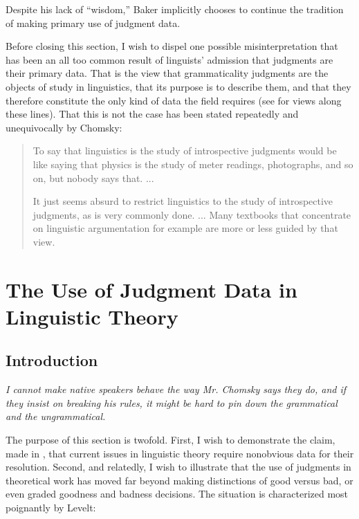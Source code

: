 \noindent
Despite his lack of ``wisdom,'' Baker implicitly chooses to continue the tradition of making primary use of judgment data.

Before closing this section, I wish to dispel one possible misinterpretation that has been an all too common result of linguists' admission that judgments are their primary data. That is the view that grammaticality judgments are the objects of study in linguistics, that its purpose is to describe them, and that they therefore constitute the only kind of data the field requires (see \citet{Sampson1975} for views along these lines). That this is not the case has been stated repeatedly and unequivocally by Chomsky:

\begin{quote}
To say that linguistics is the study of introspective judgments would be like saying that physics is the study of meter readings, photographs, and so on, but nobody says that. ...

It just seems absurd to restrict linguistics to the study of introspective judgments, as is very commonly done. ... Many textbooks that concentrate on linguistic argumentation for example are more or less guided by that view. \citep[33\textendash{}34]{Chomsky1982}
\end{quote}

\section{The Use of Judgment Data in Linguistic Theory}  \label{sec:2.3}
\subsection{Introduction} \label{sec:2.3.1}

\epigraph{\itshape I cannot make native speakers behave the way Mr. Chomsky says they do, and if they insist on breaking his rules, it might be hard to pin down the grammatical and the ungrammatical.\\[-2\baselineskip]}{\citep{Sledd1962}}

\noindent The purpose of this section is twofold. First, I wish to demonstrate the claim, made in , that current issues in linguistic theory require nonobvious data for their resolution. Second, and relatedly, I wish to illustrate that the use of judgments in theoretical work has moved far beyond making distinctions of good versus bad, or even graded goodness and badness decisions. The situation is characterized most poignantly by Levelt:


